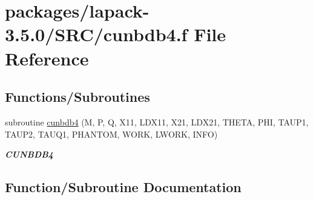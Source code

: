 \hypertarget{cunbdb4_8f}{}\section{packages/lapack-\/3.5.0/\+S\+R\+C/cunbdb4.f File Reference}
\label{cunbdb4_8f}
\subsection*{Functions/\+Subroutines}
\begin{DoxyCompactItemize}
\item 
subroutine \hyperlink{cunbdb4_8f_a98514d51140f885632f277a31acbe636}{cunbdb4} (M, P, Q, X11, L\+D\+X11, X21, L\+D\+X21, T\+H\+E\+T\+A, P\+H\+I, T\+A\+U\+P1, T\+A\+U\+P2, T\+A\+U\+Q1, P\+H\+A\+N\+T\+O\+M, W\+O\+R\+K, L\+W\+O\+R\+K, I\+N\+F\+O)
\begin{DoxyCompactList}\small\item\em {\bfseries C\+U\+N\+B\+D\+B4} \end{DoxyCompactList}\end{DoxyCompactItemize}


\subsection{Function/\+Subroutine Documentation}
\hypertarget{cunbdb4_8f_a98514d51140f885632f277a31acbe636}{}
